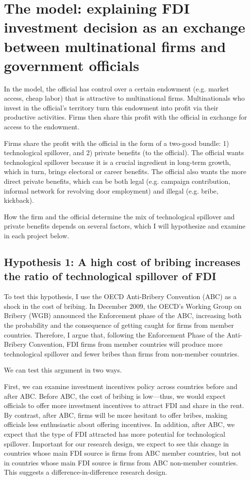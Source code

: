 \documentclass[12pt]{article}
\begin{document}
\section{The model: explaining FDI investment decision as an exchange between multinational firms and government officials}

In the model, the official has control over a certain endowment (e.g. market
access, cheap labor) that is attractive to multinational firms. Multinationals
who invest in the official's territory turn this endowment into profit via their
productive activities. Firms then share this profit with the official in
exchange for access to the endowment.  

Firms share the profit with the official in the form of a two-good bundle: 1)
technological spillover, and 2) private benefits (to the official). The official
wants technological spillover because it is a crucial ingredient in long-term
growth, which in turn, brings electoral or career benefits. The official also
wants the more direct private benefits, which can be both legal (e.g. campaign
contribution, informal network for revolving door employment) and illegal
(e.g. bribe, kickback).

How the firm and the official determine the mix of technological spillover and private
benefits depends on
several factors, which I will hypothesize and examine in each project below.

\subsection*{Hypothesis 1: A high cost of bribing increases the ratio of technological spillover of FDI}

To test this hypothesis, I use the OECD Anti-Bribery Convention (ABC) as a shock
in the cost of bribing. In December 2009, the OECD's Working Group on Bribery
(WGB) announced the Enforcement phase of the ABC, increasing both the
probability and the consequence of getting caught for firms from member
countries. Therefore, I argue that, following the Enforcement Phase of the Anti-Bribery
Convention, FDI firms from member countries will produce more technological
spillover and fewer bribes than firms from non-member countries.

We can test this argument in two ways.

{\color{red}First, we can examine investment incentives policy across countries before and after
ABC.} Before ABC, the cost of bribing is low---thus, we would expect officials to
offer more investment incentives to attract FDI and share in the rent. By
contrast, after ABC, firms will be more hesitant to offer bribes, making
officials less enthusiastic about offering incentives. In addition, after ABC,
we expect that the type of FDI attracted has more potential for technological
spillover. Important for our research design, we
expect to see this change in countries whose main FDI source is firms
from ABC member countries, but not in countries whose main FDI source is firms
from ABC non-member countries. This suggests a difference-in-difference research design.
\end{document}
